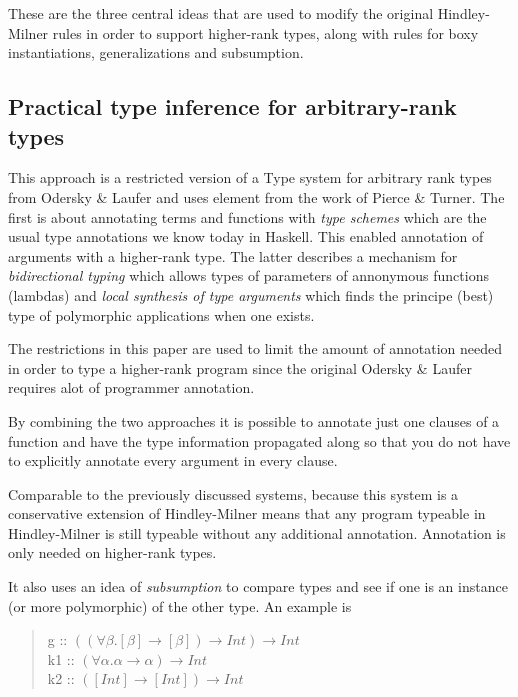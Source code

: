 These are the three central ideas that are used to modify the original Hindley-Milner rules in order to support higher-rank types, along with rules for boxy instantiations, generalizations and subsumption.

\subsection{Practical type inference for arbitrary-rank types\cite{boring}}
This approach is a restricted version of a Type system for arbitrary rank types from Odersky \& Laufer\cite{odesky} and uses element from the work of Pierce \& Turner\cite{pierce}. The first is about annotating terms and functions with \textit{type schemes} which are the usual type annotations we know today in Haskell. This enabled annotation of arguments with a higher-rank type. The latter describes a mechanism for \textit{bidirectional typing} which allows types of parameters of annonymous functions (lambdas) and \textit{local synthesis of type arguments} which finds the principe (best) type of polymorphic applications when one exists.

The restrictions in this paper are used to limit the amount of annotation needed in order to type a higher-rank program since the original Odersky \& Laufer\cite{odesky} requires alot of programmer annotation.

By combining the two approaches it is possible to annotate just one clauses of a function and have the type information propagated along so that you do not have to explicitly annotate every argument in every clause.

Comparable to the previously discussed systems, because this system is a conservative extension of Hindley-Milner means that any program typeable in Hindley-Milner is still typeable without any additional annotation. Annotation is only needed on higher-rank types.

It also uses an idea of \textit{subsumption} to compare types and see if one is an instance (or more polymorphic) of the other type. An example is

\begin{quotation}
g :: $((\forall\beta.[\beta] \rightarrow [\beta]) \rightarrow Int) \rightarrow Int$ \\
\indent k1 :: $(\forall\alpha. \alpha \rightarrow \alpha) \rightarrow Int$\\
\indent k2 :: $([Int] \rightarrow [Int]) \rightarrow Int$
\end{quotation}

